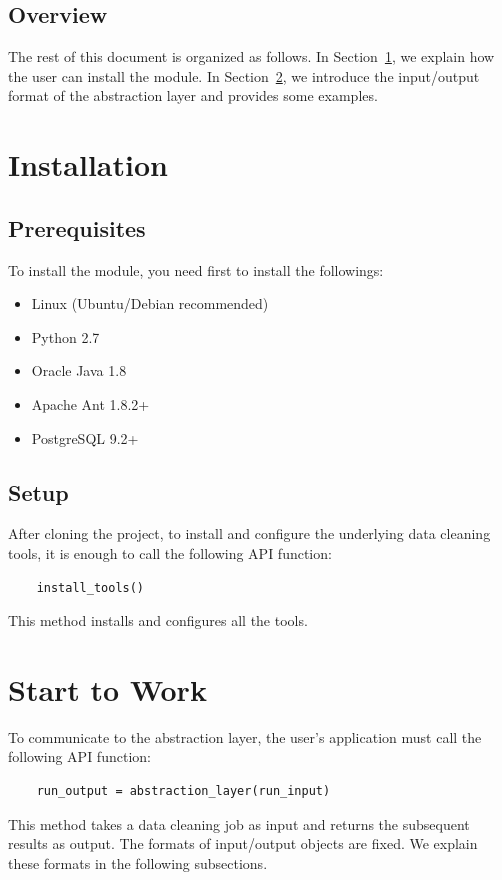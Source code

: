 \documentclass[12pt]{article}
\begin{document}
\subsection{Overview}
The rest of this document is organized as follows. In Section~\ref{section:installation}, we explain how the user can install the module. In Section~\ref{section:start_to_work}, we introduce the input/output format of the abstraction layer and provides some examples.


\section{Installation}
\label{section:installation}

\subsection{Prerequisites}
To install the module, you need first to install the followings:
\begin{itemize}
	\item Linux (Ubuntu/Debian recommended)
	\item Python 2.7
	\item Oracle Java 1.8
	\item Apache Ant 1.8.2+
	\item PostgreSQL 9.2+
\end{itemize}

\subsection{Setup}
After cloning the project, to install and configure the underlying data cleaning tools, it is enough to call the following API function:
\begin{lstlisting}
	install_tools()
\end{lstlisting}
This method installs and configures all the tools. 


\section{Start to Work}
\label{section:start_to_work}

To communicate to the abstraction layer, the user's application must call the following API function:
\begin{lstlisting}
	run_output = abstraction_layer(run_input)
\end{lstlisting}
This method takes a data cleaning job as input and returns the subsequent results as output. The formats of input/output objects are fixed. We explain these formats in the following subsections. 
\end{document}
